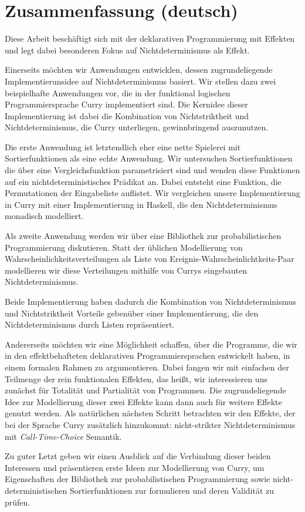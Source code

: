 \chapter*{Zusammenfassung (deutsch)}
\label{sec:abstract-diff}

Diese Arbeit besch\"aftigt sich mit der deklarativen
Programmierung mit Effekten und legt dabei besonderen Fokus auf
Nichtdeterminismus als Effekt.

Einerseits m\"ochten wir Anwendungen entwicklen, dessen
zugrundeliegende Implementierunsidee auf Nichtdeterminismus basiert.
Wir stellen dazu zwei beispielhafte Anwendungen vor, die in der
funktional logischen Programmiersprache Curry implementiert sind.
Die Kernidee dieser Implementierung ist dabei die Kombination von
Nichtstriktheit und Nichtdeterminismus, die Curry unterliegen,
gewinnbringend auszunutzen.

Die erste Anwendung ist letztendlich eher eine nette Spielerei mit
Sortierfunktionen als eine echte Anwendung.
Wir untersuchen Sortierfunktionen die \"uber eine Vergleichsfunktion
parametrisiert sind und wenden diese Funktionen auf ein
nichtdeterministisches Pr\"adikat an.
Dabei entsteht eine Funktion, die Permutationen der Eingabeliste
auflistet.
Wir vergleichen unsere Implementierung in Curry mit einer
Implementierung in Haskell, die den Nichtdeterminismus monadisch
modelliert.

Als zweite Anwendung werden wir \"uber eine Bibliothek zur
probabilistischen Programmierung diskutieren.
Statt der \"ublichen Modellierung von Wahrscheinlichkeitsverteilungen
als Liste von Ereignis-Wahrscheinlichtkeits-Paar modellieren wir diese
Verteilungen mithilfe von Currys eingebauten Nichtdeterminismus.

Beide Implementierung haben dadurch die Kombination von
Nichtdeterminismus und Nichtstriktheit Vorteile geben\"uber
einer Implementierung, die den Nichtdeterminismus durch Listen
repr\"asentiert.

Andererseits m\"ochten wir eine M\"oglichkeit schaffen, \"uber die
Programme, die wir in den effektbehafteten deklarativen
Programmiersprachen entwickelt haben, in einem formalen Rahmen zu
argumentieren.
Dabei fangen wir mit einfachen der Teilmenge der rein funktionalen
Effekten, das hei\ss{}t, wir interessieren uns zun\"achst f\"ur
Totalit\"at und Partialit\"at von Programmen.
Die zugrundeliegende Idee zur Modellierung dieser zwei Effekte kann
dann auch f\"ur weitere Effekte genutzt werden.
Als nat\"urlichen n\"achsten Schritt betrachten wir den Effekte, der
bei der Sprache Curry zus\"atzlich hinzukommt: nicht-strikter
Nichtdeterminismus mit \emph{Call-Time-Choice} Semantik.

Zu guter Letzt geben wir einen Ausblick auf die Verbindung dieser
beiden Interessen und pr\"asentieren erste Ideen zur
Modellierung von Curry, um Eigenschaften der Bibliothek zur
probabilistischen Programmierung sowie nicht-deterministischen
Sortierfunktionen zur formulieren und deren Validit\"at
zu pr\"ufen.

\endgroup